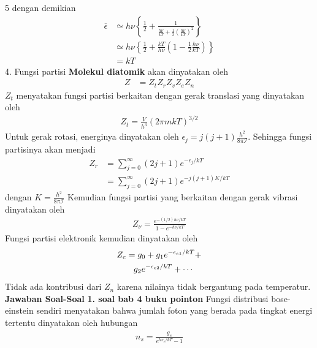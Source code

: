 \documentclass[a4paper  , 6 pt]{article}
\begin{document}
\begin{tiny}
\begin{multicols} {5}
dengan demikian 
\begin{align}
\overline{\epsilon} & \simeq h\nu \left \lbrace \frac{1}{2} + \frac{1}{\frac{h\nu}{kT} + \frac{1}{2} \left (\frac{h\nu}{kT} \right )^2}  \right \rbrace  \nonumber \\
&\simeq h \nu \left \lbrace \frac{1}{2} + \frac{kT}{h\nu} \left( 1 - \frac{1}{2} \frac{h\nu}{kT}\right) \right \rbrace  \nonumber \\
& = kT
\end{align}
4. Fungsi partisi \textbf{Molekul diatomik} akan dinyatakan oleh
\begin{align}
Z & = Z_t Z_r Z_v Z_e Z_n 
\end{align}
$Z_t $ menyatakan fungsi partisi berkaitan dengan gerak translasi yang dinyatakan oleh
\begin{align}
Z_t = \frac{V}{h^3} (2\pi m kT)^{3/2} 
\end{align}
Untuk gerak rotasi, energinya dinyatakan oleh $\epsilon_j = j(j+1) \frac{h^2} {8 \pi \mathcal{I}}$. Sehingga fungsi partisinya akan menjadi 
\begin{align}
Z_r & = \sum_{j = 0}^{\infty} (2 j + 1) e^{-\epsilon_j /kT} \nonumber \\
& = \sum_{j = 0}^{\infty} (2 j + 1) e^{- j (j+1)K /k T}  
\end{align}
dengan $K =  \frac{h^2} {8 \pi \mathcal{I}}$ \newline
Kemudian fungsi partisi yang berkaitan dengan gerak vibrasi dinyatakan oleh 
\begin{align}
\boxed{Z_\nu = \frac{e^{- (1/2) h\nu /k T}}{1 - e^{-  h\nu /kT}}}
\end{align}
Fungsi partisi elektronik kemudian dinyatakan oleh 
\begin{align}
Z_e &  = g_0 + g_1 e^{- \epsilon_{e1} /kT} + \nonumber \\
& \hspace{0.3 cm } g_2 e^{- \epsilon_{e2}/ kT} + \cdots
\end{align}
Tidak ada kontribusi dari $Z_n $ karena nilainya tidak bergantung pada temperatur.
 \newline
\textbf{Jawaban Soal-Soal} \newline
\textbf{1. soal bab 4 buku pointon} \newline
Fungsi distribusi bose-einstein sendiri menyatakan bahwa jumlah foton yang berada pada tingkat energi  tertentu dinyatakan oleh hubungan  
\begin{align}
n_s = \frac{g_s}{e^{h v_s/kT} - 1} 
\end{align}

\end{multicols}
\end{tiny}
\end{document}
